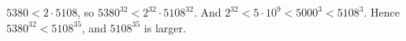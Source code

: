 $5380<2\cdot5108$, so $5380^{32}<2^{32}\cdot5108^{32}$. And $2^{32}<5\cdot10^9<5000^3<5108^3$. Hence $5380^{32}<5108^{35}$, and $\boxed{5108^{35}}$ is larger.
